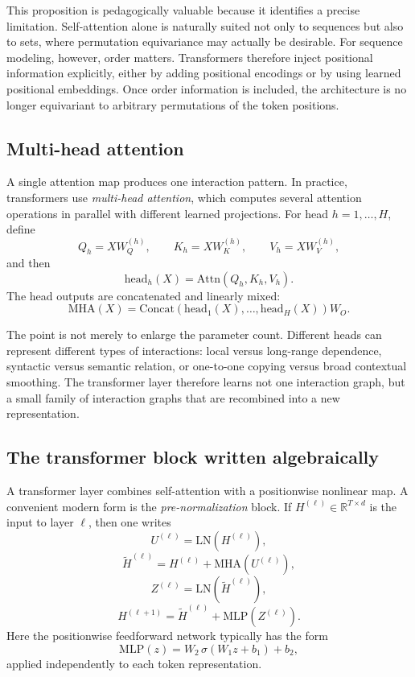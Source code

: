 This proposition is pedagogically valuable because it identifies a precise limitation.
Self-attention alone is naturally suited not only to sequences but also to sets, where permutation equivariance may actually be desirable.
For sequence modeling, however, order matters.
Transformers therefore inject positional information explicitly, either by adding positional encodings or by using learned positional embeddings.
Once order information is included, the architecture is no longer equivariant to arbitrary permutations of the token positions.

\subsection*{Multi-head attention}

A single attention map produces one interaction pattern.
In practice, transformers use \emph{multi-head attention}, which computes several attention operations in parallel with different learned projections.
For head \(h = 1,\dots,H\), define
\[
Q_h = XW_Q^{(h)},
\qquad
K_h = XW_K^{(h)},
\qquad
V_h = XW_V^{(h)},
\]
and then
\[
\mathrm{head}_h(X)
=
\mathrm{Attn}(Q_h,K_h,V_h).
\]
The head outputs are concatenated and linearly mixed:
\[
\mathrm{MHA}(X)
=
\mathrm{Concat}(\mathrm{head}_1(X),\dots,\mathrm{head}_H(X))W_O.
\]

The point is not merely to enlarge the parameter count.
Different heads can represent different types of interactions:
local versus long-range dependence,
syntactic versus semantic relation,
or one-to-one copying versus broad contextual smoothing.
The transformer layer therefore learns not one interaction graph, but a small family of interaction graphs that are recombined into a new representation.

\subsection*{The transformer block written algebraically}

A transformer layer combines self-attention with a positionwise nonlinear map.
A convenient modern form is the \emph{pre-normalization} block.
If \(H^{(\ell)} \in \mathbb{R}^{T \times d}\) is the input to layer \(\ell\), then one writes
\[
U^{(\ell)} = \mathrm{LN}(H^{(\ell)}),
\]
\[
\widetilde{H}^{(\ell)}
=
H^{(\ell)} + \mathrm{MHA}(U^{(\ell)}),
\]
\[
Z^{(\ell)} = \mathrm{LN}(\widetilde{H}^{(\ell)}),
\]
\[
H^{(\ell+1)}
=
\widetilde{H}^{(\ell)} + \mathrm{MLP}(Z^{(\ell)}).
\]
Here the positionwise feedforward network typically has the form
\[
\mathrm{MLP}(z) = W_2\,\sigma(W_1 z + b_1) + b_2,
\]
applied independently to each token representation.

